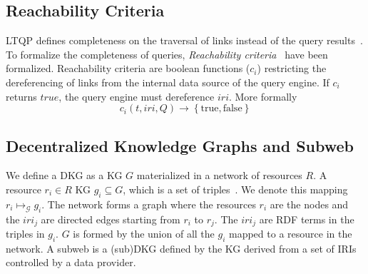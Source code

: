 \subsection{Reachability Criteria}

\ac{LTQP} defines completeness on the traversal of links instead of the query results~\cite{Hartig2012}.
To formalize the completeness of queries, \emph{Reachability criteria}~\cite{Hartig2012} have been formalized.
Reachability criteria are boolean functions ($c_i$) restricting the dereferencing of links from the internal data source of the query engine.
If $c_i$ returns $true$, the query engine must dereference $iri$.
More formally
\begin{equation}\label{eq:reachabilityCriteria}
	c_i(t, iri, Q) \rightarrow \left\{ \mathrm{true}, \mathrm{false} \right\}
\end{equation}

\subsection{Decentralized Knowledge Graphs and Subweb}\label{sec:dkg}

We define a \ac{DKG} as a  \ac{KG} $G$ materialized in a network of resources $R$.
A resource $r_i \in R$  \ac{KG} $g_i \subseteq G$, which is a set of triples~\cite{w3ConceptsAbstract}.
We denote this mapping $r_i \mapsto_{\mathcal{G}} g_i$.
The network forms a graph where the resources $r_i$ are the nodes and the $iri_j$ are directed edges starting from $r_i$ to $r_j$.
The $iri_j$ are \ac{RDF} terms in the triples in $g_i$.
$G$ is formed by the union of all the $g_i$ mapped to a resource in the network.
A subweb is a (sub)\ac{DKG} defined by the \ac{KG} derived from a set of \acp{IRI} controlled by a data provider.

